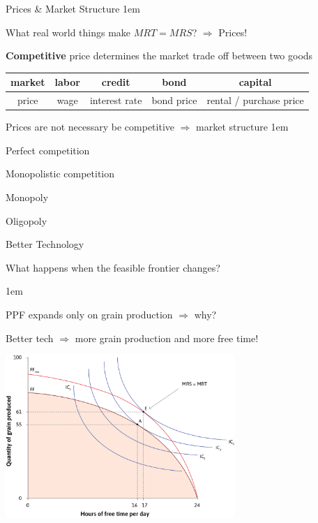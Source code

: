 \documentclass[11pt,aspectratio=43,usenames,dvipsnames]{beamer}
\let\olditemize=\itemize
\let\endolditemize=\enditemize
\renewenvironment{itemize}{\olditemize \itemsep1em}{\endolditemize}
\theoremstyle{definition}
\begin{document}
\begin{frame}{Prices \& Market Structure}
\label{slide:Prices}
    \begin{itemize}
        \item What real world things make $ MRT = MRS $? $ \Rightarrow  $ Prices!
        \item \textbf{Competitive} price determines the market trade off between two goods
        \begin{tabular}{c|c|c|c|c}
            market
                & labor & credit & bond & capital
            \\
            \hline
            price
                & wage & interest rate & bond price & rental / purchase price
            \\
        \end{tabular}
        \item Prices are not necessary be competitive $ \Rightarrow  $ \alert{market structure}
        \begin{itemize}
            \item Perfect competition
            \item Monopolistic competition
            \item Monopoly
            \item Oligopoly
        \end{itemize}

    \end{itemize}
\end{frame}

\begin{frame}{Better Technology}
\label{slide:Optimal_Decision_Making}
    \begin{center}
        What happens when the feasible frontier changes?
    \end{center}

    \begin{itemize}
        \item PPF expands \alert{only on grain production} $ \Rightarrow  $ why?
        \item Better tech $ \Rightarrow  $ more grain production and more free time!
    \end{itemize}

    \begin{center}
        \includegraphics[width=0.65\textwidth]{./figures/OptimalChange.png}
    \end{center}
\end{frame}
\end{document}
